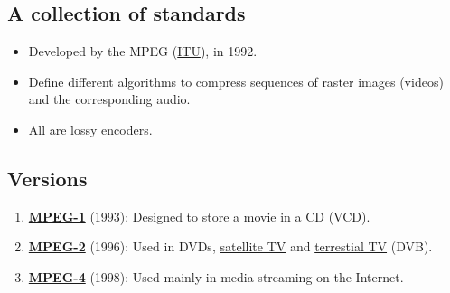 \chapter{}

\section{A collection of standards}
\begin{itemize}
\item Developed by the \gls{MPEG} (\href{https://www.itu.int}{ITU}),
  in 1992.
\item Define different algorithms to compress sequences of raster
  images (videos) and the corresponding audio.
\item All are lossy encoders.
\end{itemize}

\section{Versions}
\begin{enumerate}
\item \href{https://en.wikipedia.org/wiki/MPEG-1}{\textbf{MPEG-1}}
  (1993): Designed to store a movie in a \gls{CD} (\gls{VCD}).
\item \href{https://en.wikipedia.org/wiki/MPEG-2}{\textbf{MPEG-2}}
  (1996): Used in \glspl{DVD}, \href{https://en.wikipedia.org/wiki/Satellite_television}{satellite TV} and \href{https://en.wikipedia.org/wiki/Digital_television}{terrestial TV} (\gls{DVB}).
\item \href{https://en.wikipedia.org/wiki/MPEG-4}{\textbf{MPEG-4}}
  (1998): Used mainly in media streaming on the Internet.
\end{enumerate}

